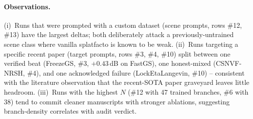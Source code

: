 \paragraph{Observations.}
(i)~Runs that were prompted with a custom dataset (\textsf{scene}
prompts, rows \#12, \#13) have the largest deltas; both deliberately
attack a previously-untrained scene class where vanilla splatfacto is
known to be weak.
(ii)~Runs targeting a specific recent paper (\textsf{target} prompts,
rows \#3, \#4, \#10) split between one verified beat (FreezeGS, \#3,
$+0.43$\,dB on FastGS), one honest-mixed (CSNVF-NRSH, \#4), and one
acknowledged failure (LockEtaLangevin, \#10) -- consistent with the
literature observation that the recent-SOTA paper graveyard leaves
little headroom.
(iii)~Runs with the highest $N$ (\#12 with 47 trained branches, \#6
with 38) tend to commit cleaner manuscripts with stronger ablations,
suggesting branch-density correlates with audit verdict.

